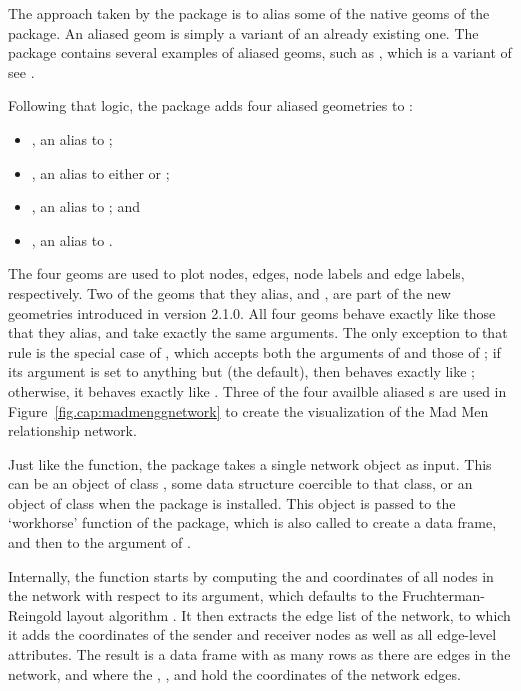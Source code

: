 The approach taken by the  package is to alias some of the native geoms of the  package. An aliased geom is simply a variant of an already existing one. The  package contains several examples of aliased geoms, such as , which is a variant of  see \citep[see][p.~67, Table~4.6]{ggplot2}.

Following that logic, the  package adds four aliased geometries to :

\begin{itemize}
  \item {}, an alias to ;
  \item {}, an alias to either  or ;
  \item {}, an alias to ; and
  \item {}, an alias to .
\end{itemize}

The four geoms are used to plot nodes, edges, node labels and edge labels, respectively. Two of the geoms that they alias,  and , are part of the new geometries introduced in  version 2.1.0. All four geoms behave exactly like those that they alias, and take exactly the same arguments. The only exception to that rule is the special case of , which accepts both the arguments of  and those of ; if its  argument is set to anything but  (the default), then  behaves exactly like ; otherwise, it behaves exactly like . Three of the four availble aliased s are used in Figure~\ref{fig.cap:madmenggnetwork} to create the visualization of the Mad Men relationship network. 

Just like the  function, the  package takes a single network object as input. This can be an object of class , some data structure coercible to that class, or an object of class  when the  package is installed. This object is passed to the `workhorse' function of the package, which is also called  to create a data frame, and then to the  argument of .

Internally, the  function starts by computing the  and  coordinates of all nodes in the network with respect to its  argument, which defaults to the Fruchterman-Reingold layout algorithm \citep{fruchterman_reingold}. It then extracts the edge list of the network, to which it adds the coordinates of the sender and receiver nodes as well as all edge-level attributes. The result is a data frame with as many rows as there are edges in the network, and where the , ,  and  hold the coordinates of the network edges.

